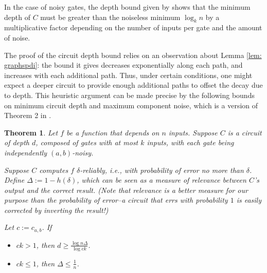 \documentclass[12pt,reqno]{amsart}
\theoremstyle{plain} %
\newtheorem{theorem}{Theorem}[section]
\theoremstyle{remark}
\theoremstyle{definition}
\begin{document}
In the case of noisy gates, the depth bound given by \cite{ES} shows that the minimum depth of $C$ must be greater than the noiseless minimum $\log_kn$ by a multiplicative factor depending on the number of inputs per gate and the amount of noise.

The proof of the circuit depth bound relies on an observation about Lemma \ref{lem: graphspdi}: the bound it gives decreases exponentially along each path, and increases with each additional path. Thus, under certain conditions, one might expect a deeper circuit to provide enough additional paths to offset the decay due to depth. This heuristic argument can be made precise by the following bounds on minimum circuit depth and maximum component noise, which is a version of Theorem 2 in \cite{ES}.

\begin{theorem}\label{thm: depthbound}
    Let $f$ be a function that depends on $n$ inputs. Suppose $C$ is a circuit of depth $d$, composed of gates with at most $k$ inputs, with each gate being independently $(a,b)$-noisy. 
    
    Suppose $C$ computes $f$ $\delta$-reliably, i.e., with probability of error no more than $\delta$. Define $\Delta:=1-h(\delta)$, which can be seen as a measure of relevance between $C$'s output and the correct result. (Note that relevance is a better measure for our purpose than the probability of error--a circuit that errs with probability $1$ is easily corrected by inverting the result!)

    Let $c:=c_{a,b}$. If
    \begin{itemize}
        \item $ck> 1$, then $d\ge\frac{\log n\Delta}{\log ck}$.
        \item $ck\le 1$, then $\Delta\le\frac{1}{n}$.
    \end{itemize}
\end{theorem}
\end{document}
